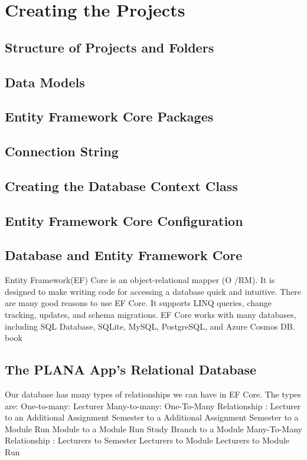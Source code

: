 \documentclass{scrartcl}
\begin{document}
\section{Creating the Projects}

\subsection{Structure of Projects and Folders}

\subsection{Data Models}

\subsection{Entity Framework Core Packages}

\subsection{Connection String}

\subsection{Creating the Database Context Class}

\subsection{Entity Framework Core Configuration}

\subsection{Database and Entity Framework Core}
Entity Framework(EF) Core is an object-relational mapper (O /RM). It is designed to make writing code for accessing a database quick and intuitive.
There are many good reasons to use EF Core. It supports LINQ queries, change tracking, updates, and schema migrations. EF Core works with many databases, including SQL Database, SQLite, MySQL, PostgreSQL, and Azure Cosmos DB.
book \cite{efa} \cite{ef}

\subsection{The PLANA App's Relational Database}
Our database has many types of relationships we can have in EF Core. The types are:
One-to-many: Lecturer
Many-to-many:
One-To-Many Relationship : 
Lecturer to an Additional Assignment 
Semester to a Additional Assignment
Semester to a Module Run 
Module to a Module Run
Study Branch to a Module
Many-To-Many Relationship :
Lecturers to Semester
Lecturers to Module
Lecturers to Module Run
\end{document}
